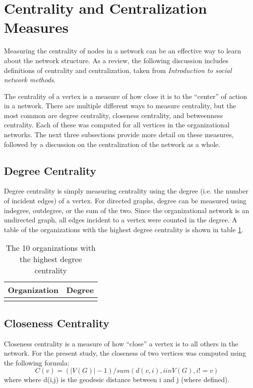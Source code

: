 \section{Centrality and Centralization Measures}
Measuring the centrality of nodes in a network can be an effective way to learn about the network structure. As a review, the following discussion includes definitions of centrality and centralization, taken from \textit{Introduction to social network methods}\cite{hanneman}.

The centrality of a vertex is a measure of how close it is to the ``center'' of action in a network. There are multiple different ways to measure centrality, but the most common are degree centrality, closeness centrality, and betweenness centrality. Each of these was computed for all vertices in the organizational networks. The next three subsections provide more detail on these measures, followed by a discussion on the centralization of the network as a whole.

\subsection{Degree Centrality}
Degree centrality is simply measuring centrality using the degree (i.e. the number of incident edges) of a vertex. For directed graphs, degree can be measured using indegree, outdegree, or the sum of the two. Since the organizational network is an undirected graph, all edges incident to a vertex were counted in the degree. A table of the organizations with the highest degree centrality is shown in table \ref{tab:degree}.

\begin{table}
	\begin{tabular}{l|c}%
		\bfseries Organization & \bfseries Degree%
		\csvreader[head to column names]{degree.csv}{}%
		{\\\hline\organizationa & \scorea}%
	\end{tabular}
	\centering
	\caption{The 10 organizations with the highest degree centrality}\label{tab:degree}
\end{table}
\subsection{Closeness Centrality}
Closeness centrality is a measure of how ``close'' a vertex is to all others in the network. For the present study, the closeness of two vertices was computed using the following formula:
\begin{equation*}
	C(v) = (|V(G)|-1)/sum( d(v,i), i in V(G), i!=v )
\end{equation*}
where where d(i,j) is the geodesic distance between i and j (where defined)\cite{butts}.

